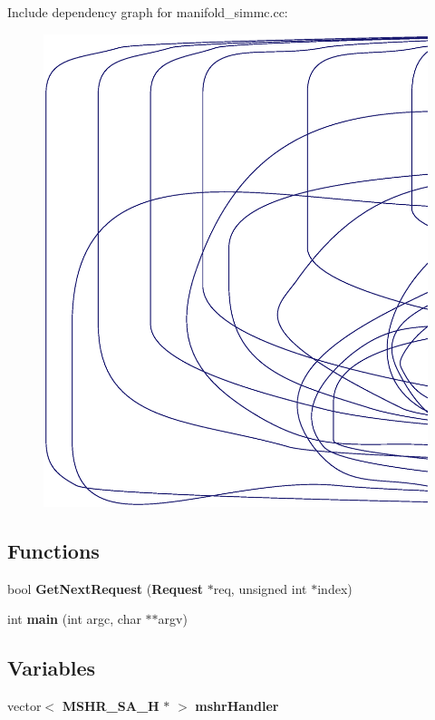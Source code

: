 Include dependency graph for manifold\_\-simmc.cc:\nopagebreak
\begin{figure}[H]
\begin{center}
\leavevmode
\includegraphics[width=420pt]{manifold__simmc_8cc__incl}
\end{center}
\end{figure}
\subsection*{Functions}
\begin{CompactItemize}
\item 
bool {\bf GetNextRequest} ({\bf Request} $\ast$req, unsigned int $\ast$index)
\item 
int {\bf main} (int argc, char $\ast$$\ast$argv)
\end{CompactItemize}
\subsection*{Variables}
\begin{CompactItemize}
\item 
vector$<$ {\bf MSHR\_\-SA\_\-H} $\ast$ $>$ {\bf mshrHandler}
\end{CompactItemize}


